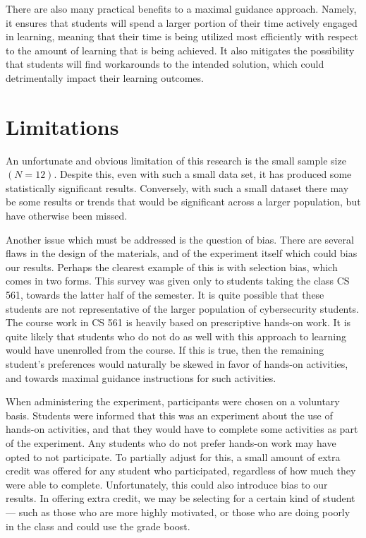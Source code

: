 There are also many practical benefits to a maximal guidance approach. 
Namely, it ensures that students will spend a larger portion of their time actively engaged in learning, meaning that their time is being utilized most efficiently with respect to the amount of learning that is being achieved. 
It also mitigates the possibility that students will find workarounds to the intended solution, which could detrimentally impact their learning outcomes. 

\section{Limitations}
    An unfortunate and obvious limitation of this research is the small sample size $(N=12)$. 
    Despite this, even with such a small data set, it has produced some statistically significant results. 
    Conversely, with such a small dataset there may be some results or trends that would be significant across a larger population, but have otherwise been missed.

    Another issue which must be addressed is the question of bias. 
    There are several flaws in the design of the materials, and of the experiment itself which could bias our results.
    Perhaps the clearest example of this is with selection bias, which comes in two forms. 
    This survey was given only to students taking the class CS 561, towards the latter half of the semester. 
    It is quite possible that these students are not representative of the larger population of cybersecurity students.
    The course work in CS 561 is heavily based on prescriptive hands-on work. 
    It is quite likely that students who do not do as well with this approach to learning would have unenrolled from the course.
    If this is true, then the remaining student's preferences would naturally be skewed in favor of hands-on activities, and towards maximal guidance instructions for such activities.
    
    When administering the experiment, participants were chosen on a voluntary basis. 
    Students were informed that this was an experiment about the use of hands-on activities, and that they would have to complete some activities as part of the experiment. 
    Any students who do not prefer hands-on work may have opted to not participate. 
    To partially adjust for this, a small amount of extra credit was offered for any student who participated, regardless of how much they were able to complete.
    Unfortunately, this could also introduce bias to our results. 
    In offering extra credit, we may be selecting for a certain kind of student --- 
    such as those who are more highly motivated, or those who are doing poorly in the class and could use the grade boost. 

